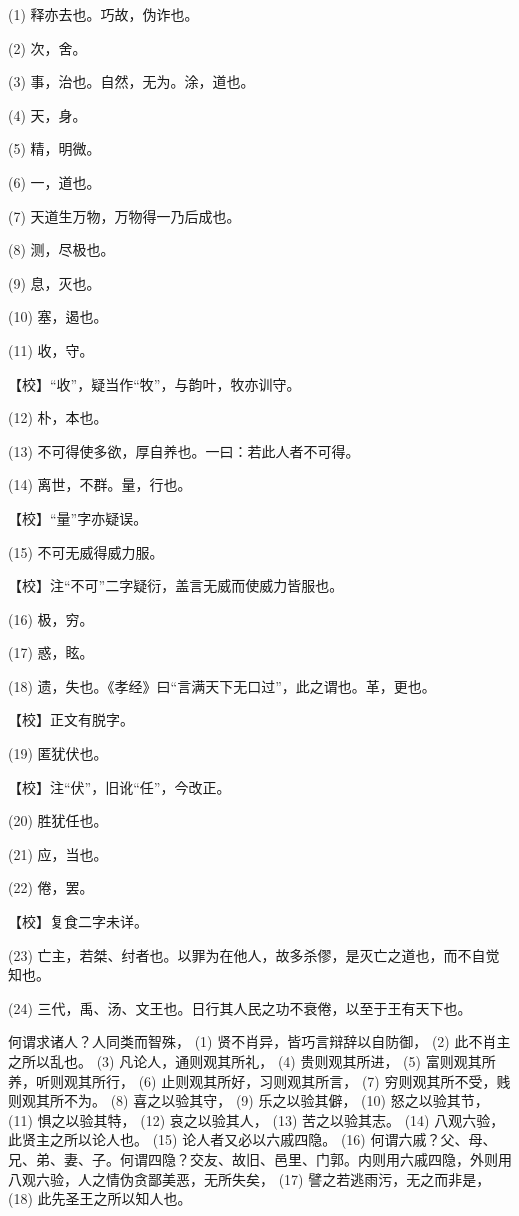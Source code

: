 \documentclass[12pt,UTF8]{ctexbook}
\begin{document}
(1) 释亦去也。巧故，伪诈也。

(2) 次，舍。

(3) 事，治也。自然，无为。涂，道也。

(4) 天，身。

(5) 精，明微。

(6) 一，道也。

(7) 天道生万物，万物得一乃后成也。

(8) 测，尽极也。

(9) 息，灭也。

(10) 塞，遏也。

(11) 收，守。

【校】“收”，疑当作“牧”，与韵叶，牧亦训守。

(12) 朴，本也。

(13) 不可得使多欲，厚自养也。一曰：若此人者不可得。

(14) 离世，不群。量，行也。

【校】“量”字亦疑误。

(15) 不可无威得威力服。

【校】注“不可”二字疑衍，盖言无威而使威力皆服也。

(16) 极，穷。

(17) 惑，眩。

(18) 遗，失也。《孝经》曰“言满天下无口过”，此之谓也。革，更也。

【校】正文有脱字。

(19) 匿犹伏也。

【校】注“伏”，旧讹“任”，今改正。

(20) 胜犹任也。

(21) 应，当也。

(22) 倦，罢。

【校】复食二字未详。

(23) 亡主，若桀、纣者也。以罪为在他人，故多杀僇，是灭亡之道也，而不自觉知也。

(24) 三代，禹、汤、文王也。日行其人民之功不衰倦，以至于王有天下也。

何谓求诸人？人同类而智殊， (1) 贤不肖异，皆巧言辩辞以自防御， (2) 此不肖主之所以乱也。 (3) 凡论人，通则观其所礼， (4) 贵则观其所进， (5) 富则观其所养，听则观其所行， (6) 止则观其所好，习则观其所言， (7) 穷则观其所不受，贱则观其所不为。 (8) 喜之以验其守， (9) 乐之以验其僻， (10) 怒之以验其节， (11) 惧之以验其特， (12) 哀之以验其人， (13) 苦之以验其志。 (14) 八观六验，此贤主之所以论人也。 (15) 论人者又必以六戚四隐。 (16) 何谓六戚？父、母、兄、弟、妻、子。何谓四隐？交友、故旧、邑里、门郭。内则用六戚四隐，外则用八观六验，人之情伪贪鄙美恶，无所失矣， (17) 譬之若逃雨污，无之而非是， (18) 此先圣王之所以知人也。
\end{document}
